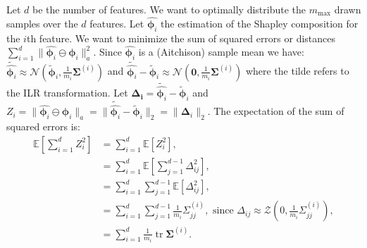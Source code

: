 \documentclass{article}
\theoremstyle{plain}
\theoremstyle{definition}
\theoremstyle{remark}
\DeclareMathOperator{\tr}{tr}
\begin{document}
Let $d$ be the number of features. We want to optimally distribute the $m_{\text{max}}$ drawn samples over the $d$ features. Let $\hat{\bm{\phi}_i}$ the estimation of the Shapley composition for the $i$th feature. We want to minimize the sum of squared errors or distances $\displaystyle\sum_{i=1}^{d} \| \hat{\bm{\phi}_i} \ominus \bm{\phi}_i \|_a^2$. Since $\hat{\bm{\phi}_i}$ is a (Aitchison) sample mean we have: $\tilde{\hat{\bm{\phi}_i}} \approx \mathcal{N}(\tilde{\bm{\phi}}_i, \frac{1}{m_i}\bm{\Sigma}^{(i)})$ and $\tilde{\hat{\bm{\phi}_i}} - \tilde{\bm{\phi}}_i \approx \mathcal{N}(\bm{0}, \frac{1}{m_i}\bm{\Sigma}^{(i)})$ where the tilde refers to the ILR transformation.
Let $\bm{\Delta_i} = \tilde{\hat{\bm{\phi}_i}} - \tilde{\bm{\phi}}_i$ and $Z_i = \| \hat{\bm{\phi}_i} \ominus \bm{\phi}_i \|_a = \| \tilde{\hat{\bm{\phi}_i}} - \tilde{\bm{\phi}}_i \|_2 = \| \bm{\Delta}_i \|_2$. The expectation of the sum of squared errors is:
\begin{equation}
  \begin{aligned}
    \mathbb{E}\left[ \sum_{i=1}^{d} Z_i^2 \right] &=   \sum_{i=1}^{d} \mathbb{E}\left[ Z_i^2 \right],\\
                                                  & =\sum_{i=1}^{d} \mathbb{E}\left[ \sum_{j=1}^{d-1}\Delta_{ij}^2 \right],\\
                                                  & =\sum_{i=1}^{d} \sum_{j=1}^{d-1} \mathbb{E}\left[\Delta_{ij}^2 \right],\\
                                                  & =\sum_{i=1}^{d} \sum_{j=1}^{d-1} \frac{1}{m_i}\Sigma_{jj}^{(i)}, \text{ since } \Delta_{ij}\approx \mathcal{Z}(0, \frac{1}{m_i}\Sigma_{jj}^{(i)}),\\
    &= \sum_{i=1}^d \frac{1}{m_i} \tr \bm{\Sigma}^{(i)}.
  \end{aligned}
\end{equation}
\end{document}
